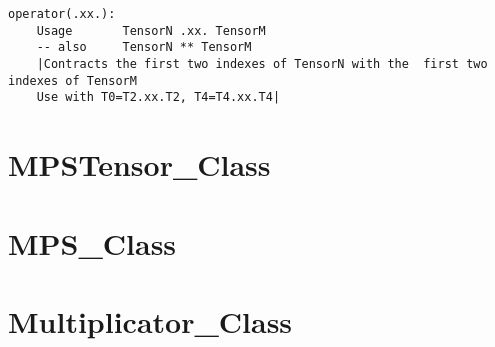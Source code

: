 \documentclass[12pt]{article}
\begin{document}
\begin{lstlisting} 
operator(.xx.): 
	Usage 		TensorN .xx. TensorM
	-- also		TensorN ** TensorM
	|Contracts the first two indexes of TensorN with the  first two indexes of TensorM
	Use with T0=T2.xx.T2, T4=T4.xx.T4|
\end{lstlisting}

\section{MPSTensor\_Class}

\section{MPS\_Class}

\section{Multiplicator\_Class}
\end{document}
